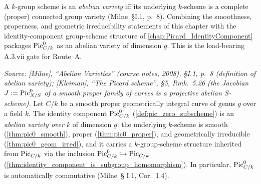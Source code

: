 A \(k\)-group scheme is an \emph{abelian variety} iff its underlying
\(k\)-scheme is a complete (proper) connected group variety
(Milne~\S I.1, p.~8). Combining the smoothness, properness, and
geometric irreducibility statements of this chapter with the
identity-component group-scheme structure of
\cref{chap:Picard_IdentityComponent} packages \(\operatorname{Pic}^0_{C/k}\) as an
abelian variety of dimension \(g\). This is the load-bearing A.3.vii
gate for Route~A.

\begin{theorem}\leanok
  \label{thm:pic0_isAbelianVariety}

  \textit{Source: [Milne], ``Abelian Varieties'' (course notes, 2008),
  \S I.1, p.~8 (definition of abelian variety); [Kleiman], ``The
  Picard scheme'', \S 5, Rmk.~5.26 (the Jacobian
  \(J := \operatorname{Pic}^0_{X/S}\) of a smooth proper family of curves is a
  projective abelian \(S\)-scheme).}
  Let \(C/k\) be a smooth proper geometrically integral curve of
  genus \(g\) over a field \(k\). The identity component
  \(\operatorname{Pic}^0_{C/k}\) (\cref{def:pic_zero_subscheme}) is an
  \emph{abelian variety over \(k\)} of dimension \(g\): the underlying
  \(k\)-scheme is smooth (\cref{thm:pic0_smooth}), proper
  (\cref{thm:pic0_proper}), and geometrically irreducible
  (\cref{thm:pic0_geom_irred}), and it carries a \(k\)-group-scheme
  structure inherited from \(\operatorname{Pic}_{C/k}\) via the inclusion
  \(\operatorname{Pic}^0_{C/k} \hookrightarrow \operatorname{Pic}_{C/k}\)
  (\cref{thm:identity_component_is_subgroup_homomorphism}). In
  particular, \(\operatorname{Pic}^0_{C/k}\) is automatically commutative (Milne~\S
  I.1, Cor.~1.4).
\end{theorem}

